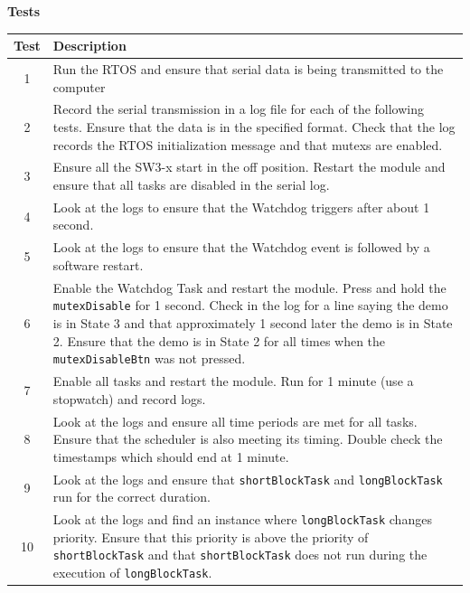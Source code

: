 \documentclass{article}
\begin{document}
\begin{center}
    \textbf{Tests} \\
    \vspace{0.5em}
    \begin{tabular}{| c | p{35em} |}
    \hline
    \textbf{Test} & \textbf{Description} \\ \hline
    1 & Run the RTOS and ensure that serial data is being transmitted to the computer \\ \hline
    2 & Record the serial transmission in a log file for each of the following tests. Ensure that the data is in the specified format. Check that the log records the RTOS initialization message and that mutexs are enabled. \\ \hline
    3 & Ensure all the SW3-x start in the off position. Restart the module and ensure that all tasks are disabled in the serial log. \\ \hline
    4 & Look at the logs to ensure that the Watchdog triggers after about 1 second. \\ \hline
    5 & Look at the logs to ensure that the Watchdog event is followed by a software restart. \\ \hline
    6 & Enable the Watchdog Task and restart the module. Press and hold the \texttt{mutexDisable} for 1 second. Check in the log for a line saying the demo is in State 3 and that approximately 1 second later the demo is in State 2. Ensure that the demo is in State 2 for all times when the \texttt{mutexDisableBtn} was not pressed. \\ \hline
    7 & Enable all tasks and restart the module. Run for 1 minute (use a stopwatch) and record logs. \\ \hline
    8 & Look at the logs and ensure all time periods are met for all tasks. Ensure that the scheduler is also meeting its timing. Double check the timestamps which should end at 1 minute. \\ \hline
    9 & Look at the logs and ensure that \texttt{shortBlockTask} and \texttt{longBlockTask} run for the correct duration. \\ \hline
    10 & Look at the logs and find an instance where \texttt{longBlockTask} changes priority. Ensure that this priority is above the priority of \texttt{shortBlockTask} and that \texttt{shortBlockTask} does not run during the execution of \texttt{longBlockTask}. \\ \hline
    \end{tabular}
\end{center}
\end{document}
